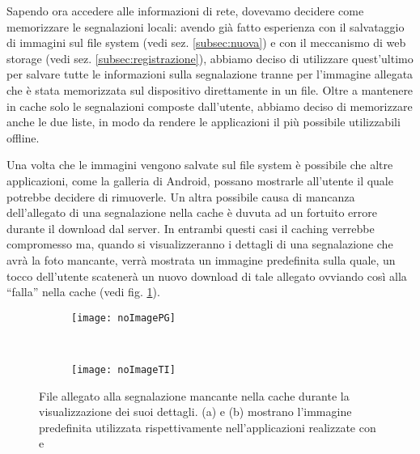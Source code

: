            Sapendo ora accedere alle informazioni di rete, dovevamo decidere
            come memorizzare le segnalazioni locali: avendo già fatto
            esperienza con il salvataggio di immagini sul file system (vedi
            sez. \ref{subsec:nuova}) e con il meccanismo di web
            storage (vedi sez. \ref{subsec:registrazione}), abbiamo deciso di
            utilizzare quest'ultimo per salvare tutte le informazioni sulla
            segnalazione tranne per l'immagine allegata che è stata memorizzata
            sul dispositivo direttamente in un file. Oltre a mantenere in cache
            solo le segnalazioni composte dall'utente, abbiamo deciso di
            memorizzare anche le due liste, in modo da rendere le applicazioni
            il più possibile utilizzabili offline.

            Una volta che le immagini vengono salvate sul file system è
            possibile che altre applicazioni, come la galleria di Android,
            possano mostrarle all'utente il quale potrebbe decidere di
            rimuoverle. Un altra possibile causa di mancanza dell'allegato di
            una segnalazione nella cache è duvuta ad un fortuito errore durante
            il download dal server. In entrambi questi casi il caching verrebbe
            compromesso ma, quando si visualizzeranno i dettagli di una
            segnalazione che avrà la foto mancante, verrà mostrata un immagine
            predefinita sulla quale, un tocco dell'utente scatenerà un nuovo
            download di tale allegato ovviando così alla ``falla'' nella cache
            (vedi fig. \ref{fig:noImages}).
            \begin{figure}[h]
                \centering
                \begin{subfigure}[b]{0.485\textwidth}
                    \texttt{[image: noImagePG]}
                    \caption{}
                \end{subfigure}
                ~
                \begin{subfigure}[b]{0.485\textwidth}
                    \texttt{[image: noImageTI]}
                    \caption{}
                \end{subfigure}
                \caption{
                    File allegato alla segnalazione mancante nella cache durante
                    la visualizzazione dei suoi dettagli. (a) e (b) mostrano
                    l'immagine predefinita utilizzata rispettivamente
                    nell'applicazioni realizzate con \pg{} e \tisdk{}
                }
                \label{fig:noImages}
            \end{figure}


